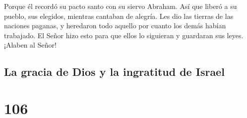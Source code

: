  Porque él recordó su pacto santo con su siervo Abraham.
 Así que liberó a su pueblo, sus elegidos, mientras
cantaban de alegría.  Les dio las tierras de las naciones
paganas, y heredaron todo aquello por cuanto los demás habían trabajado.
 El Señor hizo esto para que ellos lo siguieran y
guardaran sus leyes. ¡Alaben al Señor!

\hypertarget{la-gracia-de-dios-y-la-ingratitud-de-israel}{%
\subsection{La gracia de Dios y la ingratitud de
Israel}\label{la-gracia-de-dios-y-la-ingratitud-de-israel}}

\hypertarget{section-105}{%
\section{106}\label{section-105}}

